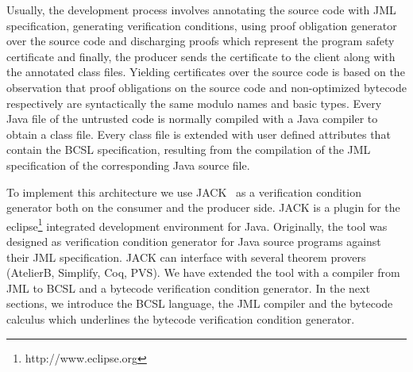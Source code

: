 Usually, the development process involves annotating the source code with JML specification,
 generating verification conditions, using proof obligation generator over the source code and 
discharging proofs which represent the program safety certificate and finally, the producer sends the certificate 
to the client along with the annotated class files.
 Yielding certificates over the source code is based on the observation that
 proof obligations on the source code and non-optimized bytecode respectively
 are syntactically the same modulo names and basic types. Every Java file of the 
untrusted code is normally compiled with a Java compiler to obtain a class file. Every class file is extended with
 user defined attributes that contain the BCSL specification, resulting from the compilation of the
 JML specification of the corresponding Java source file.



    





To implement this architecture we use JACK~\cite{BRL-JACK} as a verification condition generator both on the consumer and the
producer side. JACK is a plugin for the eclipse\footnote{http://www.eclipse.org} integrated development environment for Java.
 Originally, the tool was designed as verification condition generator for Java source programs against their JML specification.
 JACK can interface with several theorem provers (AtelierB, Simplify, Coq, PVS). We have extended the tool with a compiler from
 JML to BCSL and a bytecode verification condition generator. In the next sections, we introduce
 the BCSL language, the JML compiler and the bytecode \wpi calculus which underlines the bytecode verification condition generator.
 
